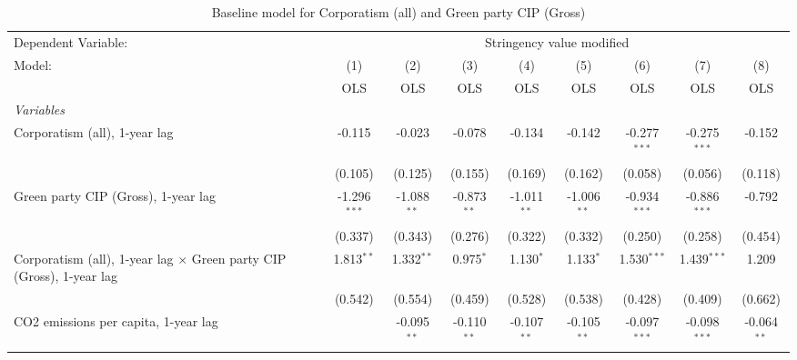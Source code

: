 
\begin{table}[htbp]
   \caption{Baseline model for Corporatism (all) and Green party CIP (Gross)}
   \centering
   \begin{tabular}{lcccccccc}
      \toprule
      Dependent Variable: & \multicolumn{8}{c}{Stringency value modified}\\
      Model:                                                                      & (1)            & (2)           & (3)           & (4)           & (5)           & (6)            & (7)            & (8)\\  
                                                                                  &  OLS           & OLS           & OLS           & OLS           & OLS           & OLS            & OLS            & OLS\\  
      \midrule
      \emph{Variables}\\
      Corporatism (all), 1-year lag                                               & -0.115         & -0.023        & -0.078        & -0.134        & -0.142        & -0.277$^{***}$ & -0.275$^{***}$ & -0.152\\   
                                                                                  & (0.105)        & (0.125)       & (0.155)       & (0.169)       & (0.162)       & (0.058)        & (0.056)        & (0.118)\\   
      Green party CIP (Gross), 1-year lag                                         & -1.296$^{***}$ & -1.088$^{**}$ & -0.873$^{**}$ & -1.011$^{**}$ & -1.006$^{**}$ & -0.934$^{***}$ & -0.886$^{***}$ & -0.792\\   
                                                                                  & (0.337)        & (0.343)       & (0.276)       & (0.322)       & (0.332)       & (0.250)        & (0.258)        & (0.454)\\   
      Corporatism (all), 1-year lag $\times$ Green party CIP (Gross), 1-year lag  & 1.813$^{**}$   & 1.332$^{**}$  & 0.975$^{*}$   & 1.130$^{*}$   & 1.133$^{*}$   & 1.530$^{***}$  & 1.439$^{***}$  & 1.209\\   
                                                                                  & (0.542)        & (0.554)       & (0.459)       & (0.528)       & (0.538)       & (0.428)        & (0.409)        & (0.662)\\   
      CO2 emissions per capita, 1-year lag                                        &                & -0.095$^{**}$ & -0.110$^{**}$ & -0.107$^{**}$ & -0.105$^{**}$ & -0.097$^{***}$ & -0.098$^{***}$ & -0.064$^{**}$\\   

\end{tabular}
\end{table}

